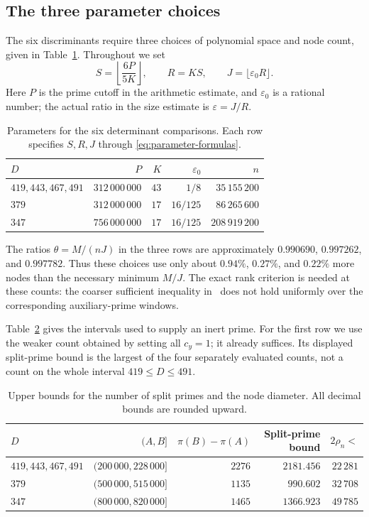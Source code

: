 \subsection{The three parameter choices}
The six discriminants require three choices of polynomial space and node
count, given in Table~\ref{tab:parameters}. Throughout we set
\begin{equation}\label{eq:parameter-formulas}
 S=\left\lfloor\frac{6P}{5K}\right\rfloor,\qquad R=KS,\qquad
 J=\lfloor\varepsilon_0R\rfloor.
\end{equation}
Here $P$ is the prime cutoff in the arithmetic estimate, and
$\varepsilon_0$ is a rational number; the actual ratio in the size estimate
is $\varepsilon=J/R$.
\begin{table}[ht]
\centering
\begin{tabular}{lrrrr}
\toprule
$D$ & $P$ & $K$ & $\varepsilon_0$ & $n$\\
\midrule
$419,443,467,491$ & $312\,000\,000$ & $43$ & $1/8$ & $35\,155\,200$\\
$379$ & $312\,000\,000$ & $17$ & $16/125$ & $86\,265\,600$\\
$347$ & $756\,000\,000$ & $17$ & $16/125$ & $208\,919\,200$\\
\bottomrule
\end{tabular}
\caption{Parameters for the six determinant comparisons. Each row specifies
$S,R,J$ through \eqref{eq:parameter-formulas}.}
\label{tab:parameters}
\end{table}

The ratios $\theta=M/(nJ)$ in the three rows are approximately
$0.990690$, $0.997262$, and $0.997782$. Thus these choices use only about
$0.94\%$, $0.27\%$, and $0.22\%$ more nodes than the necessary minimum
$M/J$. The exact rank criterion is needed at these counts: the coarser
sufficient inequality in~\cite[Theorem 5.1]{chung498} does not hold
uniformly over the corresponding auxiliary-prime windows.

Table~\ref{tab:prime-windows} gives the intervals used to supply an inert
prime. For the first row we use the weaker count obtained by setting all
$c_y=1$; it already suffices. Its displayed split-prime bound is the largest
of the four separately evaluated counts, not a count on the whole
interval $419\leq D\leq491$.
\begin{table}[ht]
\centering
\begin{tabular}{lrrrr}
\toprule
$D$ & $(A,B]$ & $\pi(B)-\pi(A)$ & Split-prime bound & $2\rho_n<$\\
\midrule
$419,443,467,491$ & $(200\,000,228\,000]$ & $2276$ & $2181.456$ & $22\,281$\\
$379$ & $(500\,000,515\,000]$ & $1135$ & $990.602$ & $32\,708$\\
$347$ & $(800\,000,820\,000]$ & $1465$ & $1366.923$ & $49\,785$\\
\bottomrule
\end{tabular}
\caption{Upper bounds for the number of split primes and the node diameter.
All decimal bounds are rounded upward.}
\label{tab:prime-windows}
\end{table}

